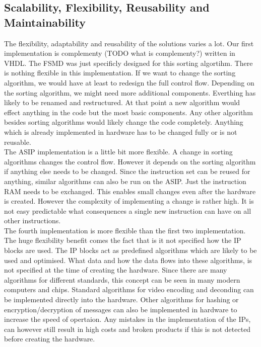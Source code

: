 \documentclass[conference]{IEEEtran}
\begin{document}
\subsection{Scalability, Flexibility, Reusability and Maintainability}
The flexibility, adaptability and reusability of the solutions varies a lot. Our first implementation is complementy (TODO what is complementy?) written in VHDL. The FSMD was just specificly designed for this sorting algortihm. There is nothing flexible in this implementation. If we want to change the sorting algorithm, we would have at least to redesign the full control flow. Depending on the sorting algorithm, we might need more additional components. Everthing has likely to be renamed and restructured. At that point a new algorithm would effect anything in the code but the most basic components. Any other algorithm besides sorting algorithms would likely change the code completely. Anything which is already implemented in hardware has to be changed fully or is not reusable. \\
The ASIP implementation is a little bit more flexible. A change in sorting algorithms changes the control flow. However it depends on the sorting algorithm if anything else needs to be changed. Since the instruction set can be reused for anything, similar algorithms can also be run on the ASIP. Just the instruction RAM needs to be exchanged. This enables small changes even after the hardware is created. However the complexity of implementing a change is rather high. It is not easy predictable what consequences a single new instruction can have on all other instructions. \\
The fourth implementation is more flexible than the first two implementation. The huge flexibility benefit comes the fact that is it not specified how the IP blocks are used. The IP blocks act as predefined algorithms which are likely to be used and optimised. What data and how the data flows into these algorithms, is not specified at the time of creating the hardware. Since there are many algorithms for different standards, this concept can be seen in many modern computers and chips. Standard algorithms for video encoding and deconding can be implemented directly into the hardware. Other algorithms for hashing or encryption/decryption of messages can also be implemented in hardware to increase the speed of opertaion. Any mistakes in the implementation of the IPs, can however still result in high costs and broken products if this is not detected before creating the hardware. \\
\end{document}

